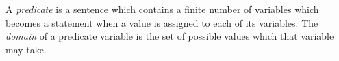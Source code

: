 \guard



\begin{defn}
\label{defn:predicate}
  A \emph{predicate} is a sentence which contains a finite number of variables which becomes a statement when a value is assigned to each of its variables.
  The \emph{domain} of a predicate variable is the set of possible values which that variable may take.
\end{defn}
